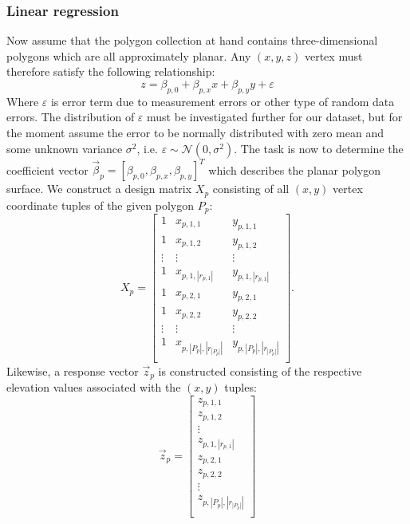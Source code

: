 \subsubsection{Linear regression}

Now assume that the polygon collection at hand contains three-dimensional polygons which are all approximately planar.
Any $(x, y, z)$ vertex must therefore satisfy the following relationship:
%
\begin{equation*}
  z = \beta_{p,0} + \beta_{p,x} x + \beta_{p,y} y + \varepsilon
\end{equation*}
%
Where $\varepsilon$ is error term due to measurement errors or other type of random data errors.
The distribution of $\varepsilon$ must be investigated further for our dataset, but for the moment assume the error to be normally distributed with zero mean and some unknown variance $\sigma^2$, i.e. $\varepsilon \sim \mathcal{N}(0, \sigma^2)$.
%
The task is now to determine the coefficient vector $\vec{\beta}_p = {[\beta_{p,0}, \beta_{p,x}, \beta_{p,y}]}^T$ which describes the planar polygon surface.
We construct a design matrix $X_p$ consisting of all $(x, y)$ vertex coordinate tuples of the given polygon $P_p$:
%
\begin{equation*}
  X_p
  =
  \begin{bmatrix}
    1 & x_{p,1,1} & y_{p,1,1} \\
    1 & x_{p,1,2} & y_{p,1,2} \\
    \vdots & \vdots & \vdots \\
    1 & x_{p,1,|r_{p,1}|} & y_{p,1,|r_{p,1}|} \\
    1 & x_{p,2,1} & y_{p,2,1} \\
    1 & x_{p,2,2} & y_{p,2,2} \\
    \vdots & \vdots & \vdots \\
    1 & x_{p,|P_p|,|r_{|P_p|}|} & y_{p,|P_p|,|r_{|P_p|}|} \\
  \end{bmatrix}.
\end{equation*}
%
Likewise, a response vector $\vec{z}_p$ is constructed consisting of the respective elevation values associated with the $(x, y)$ tuples:
%
\begin{equation*}
  \vec{z}_p
  =
  \begin{bmatrix}
     z_{p,1,1} \\
     z_{p,1,2} \\
     \vdots \\
     z_{p,1,|r_{p,1}|} \\
     z_{p,2,1} \\
     z_{p,2,2} \\
     \vdots \\
     z_{p,|P_p|,|r_{|P_p|}|} \\
  \end{bmatrix}
\end{equation*}
